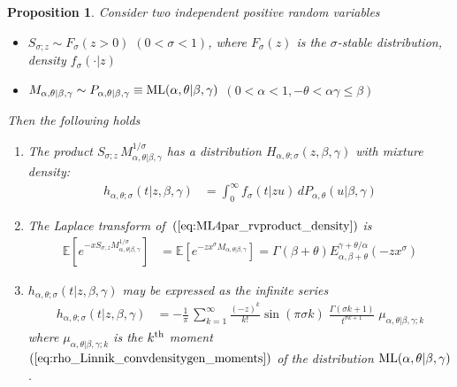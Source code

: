 \documentclass[a4paper,12pt]{article}
\newtheorem{proposition}{Proposition}
\begin{document}
{{{\begin{proposition}
\label{prop:ML4par_rvproduct}
Consider two  independent  positive random variables
\begin{itemize}
\setlength{\itemsep}{0pt}
\item $S_{\sigma;z} \sim F_\sigma(z>0)$ $(0<\sigma<1)$,  where $F_\sigma(z)$ is  the  
$\sigma$-stable distribution, density $f_\sigma(\cdot\vert z)$ 
\item $M_{\alpha,\theta \vert\beta,\gamma} \sim P_{\alpha,\theta\vert\beta,\gamma}\equiv {\rm ML}(\alpha,\theta \vert \beta,\gamma)$ 
$(0<\alpha<1,  -\theta<\alpha\gamma\le\beta)$
\end{itemize}
Then the following holds
\begin{enumerate}
\setlength{\itemsep}{0pt}
\item The product $S_{\sigma;z} \, M_{\alpha,\theta\vert\beta,\gamma}^{1/\sigma}$  has a distribution 
$H_{\alpha,\theta; \sigma}(z,\beta,\gamma)$ with mixture density:
\begin{align}
h_{\alpha,\theta; \sigma}(t \vert z , \beta,\gamma)
&=  \int_0^\infty  f_\sigma(t \vert z u) \, dP_{\alpha,\theta}(u\vert\beta,\gamma)
\label{eq:ML4par_rvproduct_density}
\end{align}
\item The  Laplace transform %
of~$(\ref{eq:ML4par_rvproduct_density})$ is 
\begin{align}
 \mathbb{E}\left[e^{-xS_{\sigma;z} M_{\alpha,\theta \vert\beta,\gamma}^{1/\sigma}}\right]  
 &=  \mathbb{E}\left[e^{-zx^\sigma M_{\alpha,\theta \vert\beta,\gamma}}\right] 
 = \Gamma(\beta+\theta)E^{\gamma+\theta/\alpha}_{\alpha,\beta+\theta}(-z x^\sigma) %
\label{eq:ML4par_rvproduct_LT}
\end{align}
\item $h_{\alpha,\theta; \sigma}(t \vert z , \beta,\gamma)$  may  be expressed as the infinite series
\begin{align}
h_{\alpha,\theta; \sigma}(t \vert z , \beta,\gamma)
&= -  \frac{1}{\pi}\,   \sum_{k=1}^\infty  \frac{(-z)^k}{k!} \sin(\pi\sigma k) \; \frac{\Gamma(\sigma k+1)}{t^{\sigma k+1}}  \;
 \mu_{\alpha,\theta\vert\beta,\gamma;k} 
\label{eq:ML4par_rvproduct_density_infseries}
\end{align}
where $\mu_{\alpha,\theta\vert\beta,\gamma;k}$ is the $k^{\rm th}$ moment~$(\ref{eq:rho_Linnik_convdensitygen_moments})$ 
of the distribution ${\rm ML}(\alpha,\theta \vert \beta,\gamma)$.
\end{enumerate}
\end{proposition}

}}}
\end{document}

